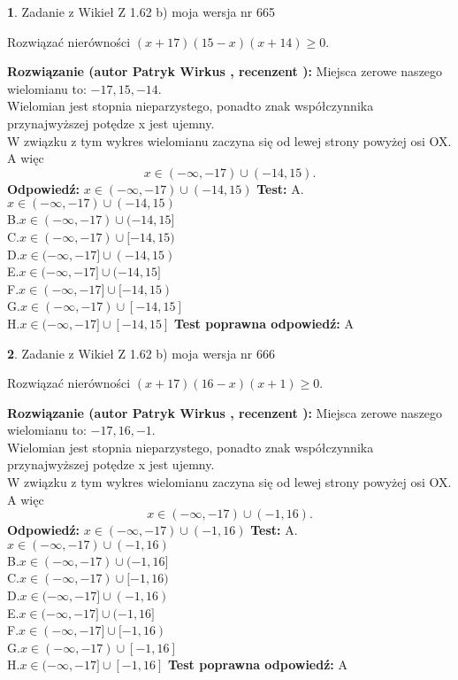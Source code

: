 \documentclass[12pt, a4paper]{article}
\theoremstyle{definition} %
\newtheorem{zad}{}
\newcommand{\zadStart}[1]{\begin{zad}#1\newline}
\newcommand{\zadStop}{\end{zad}}
\newcommand{\rozwStart}[2]{\noindent \textbf{Rozwiązanie (autor #1 , recenzent #2): }\newline}
\newcommand{\rozwStop}{\newline}
\newcommand{\odpStart}{\noindent \textbf{Odpowiedź:}\newline}
\newcommand{\odpStop}{\newline}
\newcommand{\testStart}{\noindent \textbf{Test:}\newline}
\newcommand{\testStop}{\newline}
\newcommand{\kluczStart}{\noindent \textbf{Test poprawna odpowiedź:}\newline}
\newcommand{\kluczStop}{\newline}
\begin{document}
\zadStart{Zadanie z Wikieł Z 1.62 b) moja wersja nr 665}

Rozwiązać nierówności $(x+17)(15-x)(x+14)\ge0$.
\zadStop
\rozwStart{Patryk Wirkus}{}
Miejsca zerowe naszego wielomianu to: $-17, 15, -14$.\\
Wielomian jest stopnia nieparzystego, ponadto znak współczynnika przy\linebreak najwyższej potędze x jest ujemny.\\ W związku z tym wykres wielomianu zaczyna się od lewej strony powyżej osi OX. A więc $$x \in (-\infty,-17) \cup (-14,15).$$
\rozwStop
\odpStart
$x \in (-\infty,-17) \cup (-14,15)$
\odpStop
\testStart
A.$x \in (-\infty,-17) \cup (-14,15)$\\
B.$x \in (-\infty,-17) \cup (-14,15]$\\
C.$x \in (-\infty,-17) \cup [-14,15)$\\
D.$x \in (-\infty,-17] \cup (-14,15)$\\
E.$x \in (-\infty,-17] \cup (-14,15]$\\
F.$x \in (-\infty,-17] \cup [-14,15)$\\
G.$x \in (-\infty,-17) \cup [-14,15]$\\
H.$x \in (-\infty,-17] \cup [-14,15]$
\testStop
\kluczStart
A
\kluczStop



\zadStart{Zadanie z Wikieł Z 1.62 b) moja wersja nr 666}

Rozwiązać nierówności $(x+17)(16-x)(x+1)\ge0$.
\zadStop
\rozwStart{Patryk Wirkus}{}
Miejsca zerowe naszego wielomianu to: $-17, 16, -1$.\\
Wielomian jest stopnia nieparzystego, ponadto znak współczynnika przy\linebreak najwyższej potędze x jest ujemny.\\ W związku z tym wykres wielomianu zaczyna się od lewej strony powyżej osi OX. A więc $$x \in (-\infty,-17) \cup (-1,16).$$
\rozwStop
\odpStart
$x \in (-\infty,-17) \cup (-1,16)$
\odpStop
\testStart
A.$x \in (-\infty,-17) \cup (-1,16)$\\
B.$x \in (-\infty,-17) \cup (-1,16]$\\
C.$x \in (-\infty,-17) \cup [-1,16)$\\
D.$x \in (-\infty,-17] \cup (-1,16)$\\
E.$x \in (-\infty,-17] \cup (-1,16]$\\
F.$x \in (-\infty,-17] \cup [-1,16)$\\
G.$x \in (-\infty,-17) \cup [-1,16]$\\
H.$x \in (-\infty,-17] \cup [-1,16]$
\testStop
\kluczStart
A
\kluczStop
\end{document}
